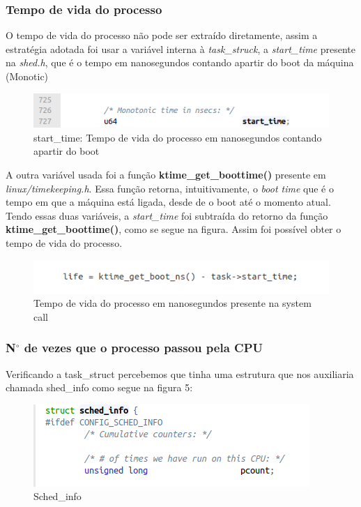 \documentclass[12pt]{article}
\begin{document}
\subsubsection{Tempo de vida do processo}
O tempo de vida do processo não pode ser extraído diretamente, assim a estratégia adotada foi usar a  variável interna à \textit{task\_struck}, a \textit{start\_time} presente na \textit{shed.h}, que é o tempo em nanosegundos contando apartir do boot da máquina (Monotic) \cite{robertlinux}
 \begin{figure}[!htb]
	\centering
	\includegraphics{imagens/start.png} 
	\caption{start\_time: Tempo de vida do processo em nanosegundos contando apartir do boot}
	\label{start}
\end{figure}
A outra variável usada foi a função  \textbf{ktime\_get\_boottime()} presente em \textit{linux/timekeeping.h}. Essa função retorna, intuitivamente, o \textit{boot time} que é o tempo em que a máquina está ligada, desde de o boot até o momento atual. Tendo essas duas variáveis, a \textit{start\_time} foi subtraída do retorno da função \textbf{ktime\_get\_boottime()}, como se segue na figura. Assim foi possível obter o tempo de vida do processo. 
 \begin{figure}[!htb]
	\centering
	\includegraphics{imagens/life.png} 
	\caption{Tempo de vida do processo em nanosegundos presente na system call}
	\label{life}
\end{figure}

\subsubsection{N$^{\circ}$  de vezes que o processo passou pela CPU}
	Verificando a task\_struct percebemos que tinha uma estrutura que nos auxiliaria chamada shed\_info como segue na figura 5:
 
 \begin{figure}[!htb]
	\centering
\includegraphics[scale=0.7]{imagens/shed_info.png} 
	\caption{Sched\_info}
	\label{schedinf}
\end{figure}	
\end{document}
